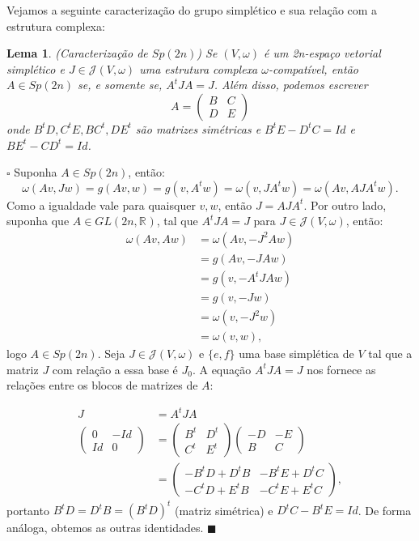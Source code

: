 \documentclass[12pt]{book}
\newtheorem{lema}[teorema]{Lema}
\newenvironment{prova}[1]{$\square$ #1}{\hfill$\blacksquare$}
\newcommand{\estruturacomplexa}{J_{0}}
\newcommand{\estruturascomplexaspadrao}{\mathcal{J}(V, \omega)}
\newcommand{\generalgroup}[2]{GL(#1, #2)}
\newcommand{\generalgroupreal}[1]{\generalgroup{#1}{\real{}}}
\newcommand{\gruposimpletico}[1]{Sp(#1)}
\newcommand{\real}[1]{\mathbb{R}^{#1}}
\begin{document}
	Vejamos a seguinte caracterização do grupo simplético e sua relação com a estrutura complexa:
	
	\begin{lema}\label{lema_caracterizacao_Sp2n}
		(Caracterização de $Sp(2n)$) Se $(V, \omega)$ é um 2n-espaço vetorial simplético e $J \in \estruturascomplexaspadrao$ uma estrutura complexa $\omega$-compatível, então $A\in Sp(2n)$ se, e somente se, $A^{t}JA = J$. Além disso, podemos escrever 
		$$
		A=
		\left(
		\begin{array}{cc}
		B & C
		\\
		D & E
		\end{array}
		\right)
		$$
		onde $B^{t}D, C^{t}E, BC^{t}, DE^{t} $ são matrizes simétricas e $B^{t}E - D^{t}C = Id$ e $BE^{t} - CD^{t} = Id$.
	\end{lema}
	\begin{prova}
		Suponha $A \in Sp(2n)$, então:
		$$
		\omega(Av, Jw)= g(Av,w) = g(v,A^{t}w) = \omega(v, JA^{t}w) = \omega(Av, AJA^{t}w).
		$$
		Como a igualdade vale para quaisquer $v,w$, então $J = AJA^{t}$. Por outro lado, suponha que $A \in \generalgroupreal{2n}$, tal que $A^{t}JA=J$ para $J \in \estruturascomplexaspadrao$, então:
		$$
		\begin{aligned}
		\omega(Av, Aw) &= \omega(Av, -J^{2}Aw)
		\\
		&=g(Av, -JAw) 
		\\
		&= g(v, -A^{t}JAw) 
		\\
		&= g(v, -Jw) 
		\\
		&= \omega(v, -J^{2}w) 
		\\
		&= \omega(v, w), 
		\end{aligned}
		$$
		logo $A \in \gruposimpletico{2n}$. Seja $J \in \estruturascomplexaspadrao$ e $\{e, f\}$ uma base simplética de $V$ tal que a matriz $J$ com relação a essa base é $\estruturacomplexa$. A equação $A^{t}JA=J$ nos fornece as relações entre os blocos de matrizes de $A$:
		
		$$
		\begin{aligned}
		J &= A^{t}JA
		\\
		\left(
		\begin{array}{cc}
		0 & -Id
		\\
		Id & 0
		\end{array}
		\right)
		&=
		\left(
		\begin{array}{cc}
		B^{t} & D^{t}
		\\
		C^{t} & E^{t}
		\end{array}
		\right)
		\left(
		\begin{array}{cc}
		-D & -E
		\\
		B & C
		\end{array}
		\right)
		\\
		&=
		\left(
		\begin{array}{cc}
		-B^{t}D +D^{t}B & -B^{t}E+D^{t}C
		\\
		-C^{t}D+E^{t}B & -C^{t}E+E^{t}C
		\end{array}
		\right),
		\end{aligned}
		$$
		portanto $B^{t}D = D^{t}B = (B^{t}D)^{t}$ (matriz simétrica) e $D^{t}C-B^{t}E = Id$. De forma análoga, obtemos as outras identidades.
	\end{prova}
	
\end{document}
